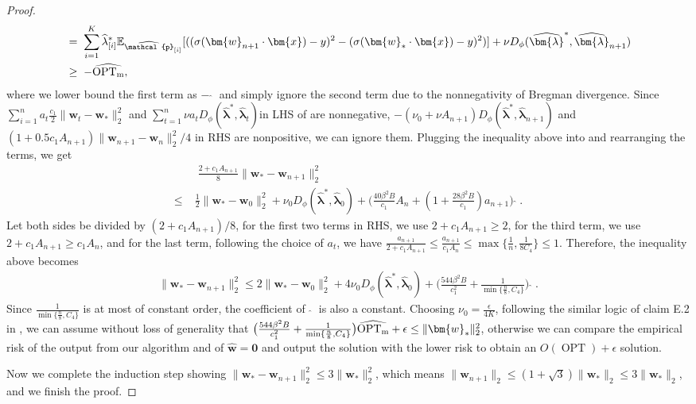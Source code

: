\documentclass[11pt]{article}
\newcounter{thm}
\numberwithin{thm}{section}
\theoremstyle{plain}
\theoremstyle{definition}
\theoremstyle{remark} \newtheorem{remark}[thm]{Remark}
\def\eps{{\epsilon}}
\def\vzero{{\bm{0}}}
\def\vlambda{{\bm{\lambda}}}
\def\vw{{\bm{w}}}
\def\vx{{\bm{x}}}
\def\ep{\widehat{\mathcal{p}}}
\newcommand{\E}{\mathbb{E}}
\DeclarePairedDelimiter\norm{\|}{\|}
\newcommand{\epi}{\ep_{[i]}}
\newcommand{\elambda}{\widehat{\lambda}}
\newcommand{\evlambda}{\widehat{\vlambda}}
\DeclareMathOperator{\OPT}{OPT}
\DeclareMathOperator{\mOPT}{OPT_m}
\newcommand{\mOPThat}{\widehat{\mOPT}}
\begin{document}
\begin{proof}
\begin{align*}
        &=\;\sum_{i=1}^K\elambda_{[i]}^{*}\E_{\epi}[((\sigma(\vw_{n+1} \cdot \vx)-y)^{2}-(\sigma(\vw_* \cdot \vx)-y)^{2})]+\nu D_{\phi}(\evlambda^*,\evlambda_{n+1}) \\
        &\ge \;-\mOPThat, \notag
    \end{align*}
where we lower bound the first term as \(-\mOPThat\) and simply ignore the second term due to the nonnegativity of Bregman divergence. Since \(\sum_{i=1}^na_{t}\frac{c_1}{2} \|\vw_{t} - \vw_*\|_{2}^{2}\) and \(\sum_{t=1}^n \nu a_{t}D_{\phi}(\evlambda^*,\evlambda_{t})\)in LHS of  are nonnegative, \(-(\nu_0 + \nu A_{n+1})D_\phi(\evlambda^*, \evlambda_{n+1})\) and \((1+0.5c_1A_{n+1})\|\vw_{n+1}-\vw_n\|_2^2/4\) in RHS are nonpositive, we can ignore them. Plugging the inequality above into  and rearranging the terms, we get
    \begin{align*}
       &\; \frac{2 + c_1A_{n+1}}{8}\|\vw_* - \vw_{n+1}\|_2^2\\
       \le\; & \frac{1}{2}\|\vw_* - \vw_0\|_2^2 + \nu_0 D_\phi(\evlambda^*, \evlambda_0)+\big(\frac{40\beta^2B}{c_1}A_n+(1+\frac{28\beta^2B}{c_1})a_{n+1}\big)\mOPThat.
    \end{align*}
Let both sides be divided by \((2+c_1A_{n+1})/8\), for the first two terms in RHS, we use \(2+c_1A_{n+1}\ge 2\), for the third term, we use \(2+c_1A_{n+1}\ge c_1A_n\), and for the last term, following the choice of \(a_t\), we have \(\frac{a_{n+1}}{2+c_1A_{n+1}}\le \frac{a_{n+1}}{c_1A_n} \le \max\{\frac{1}{n}, \frac{1}{8C_4}\} \le 1\). Therefore, the inequality above becomes
    \begin{align*}
        \|\vw_* - \vw_{n+1}\|_2^2 \le 2\|\vw_* - \vw_0\|_2^2 + 4\nu_0 D_\phi(\evlambda^*, \evlambda_0)+\big(\frac{544\beta^2B}{c_1^2}+\frac{1}{\min\{\frac{n}{8},C_4\}}\big)\mOPThat.
    \end{align*}
Since \(\frac{1}{\min\{\frac{n}{8},C_4\}}\) is at most of constant order, the coefficient of \(\mOPThat\) is also a constant. Choosing \(\nu_0=\frac{\eps}{4K}\), following the similar logic of claim E.2 in \citep{Li2024shifts}, we can assume without loss of generality that \(\big(\frac{544\beta^2B}{c_1^2}+\frac{1}{\min\{\frac{n}{8},C_4\}}\big)\mOPThat+\eps\le \norm{\vw_*}_2^2\), otherwise we can compare the empirical risk of the output from our algorithm and of \(\hat{\vw} = \vzero\) and output the solution with the lower risk to obtain an \(O(\OPT)+\eps\) solution.

Now we complete the induction step showing \(\|\vw_* - \vw_{n+1}\|_2^2 \le 3\|\vw_*\|_2^2\), which means \(\|\vw_{n+1}\|_2 \le (1+\sqrt{3})\|\vw_*\|_2 \le 3\|\vw_*\|_2\), and we finish the proof. 
\end{proof}
\end{document}
